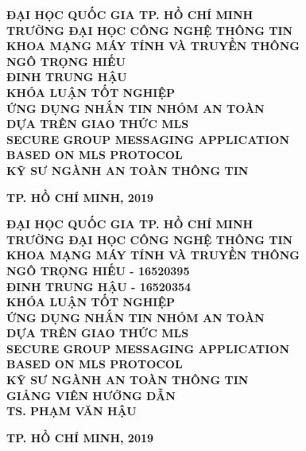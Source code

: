 \documentclass[../main-report.tex]{subfiles}
\begin{document}
\begin{titlepage}
\thispagestyle{empty}
\thisfancypage{
\setlength{\fboxsep}{3pt}
\fbox}{} 
\begin{center}
{\bf\large ĐẠI HỌC QUỐC GIA TP. HỒ CHÍ MINH}\\
{\bf\subtitlesize TRƯỜNG ĐẠI HỌC CÔNG NGHỆ THÔNG TIN}\\
{\bf\subtitlesize KHOA MẠNG MÁY TÍNH VÀ TRUYỀN THÔNG}\\[2.5cm]

{\bf\large NGÔ TRỌNG HIẾU}\\
{\bf\large ĐINH TRUNG HẬU}\\[2.5cm]

{\bf\large KHÓA LUẬN TỐT NGHIỆP}\\[0.5cm]
{\bf\Large ỨNG DỤNG NHẮN TIN NHÓM AN TOÀN}\\
{\bf\Large DỰA TRÊN GIAO THỨC MLS}\\[0.7cm]

{\bf\Large SECURE GROUP MESSAGING APPLICATION}\\
{\bf\Large BASED ON MLS PROTOCOL}\\[3cm]
{\bf\large KỸ SƯ NGÀNH AN TOÀN THÔNG TIN}\\[2cm]

\end{center}

\vspace{4cm}
\begin{center}
{\bf TP. HỒ CHÍ MINH, 2019}
\end{center}
\newpage

\thispagestyle{empty}
\thisfancypage{
\setlength{\fboxsep}{3pt}
\fbox}{} 
\begin{center}
{\bf\large ĐẠI HỌC QUỐC GIA TP. HỒ CHÍ MINH}\\
{\bf\subtitlesize TRƯỜNG ĐẠI HỌC CÔNG NGHỆ THÔNG TIN}\\
{\bf\subtitlesize KHOA MẠNG MÁY TÍNH VÀ TRUYỀN THÔNG}\\[3cm]

{\bf\large NGÔ TRỌNG HIẾU - 16520395}\\
{\bf\large ĐINH TRUNG HẬU - 16520354}\\[3cm]

{\bf\large KHÓA LUẬN TỐT NGHIỆP}\\[0.5cm]
{\bf\Large ỨNG DỤNG NHẮN TIN NHÓM AN TOÀN}\\
{\bf\Large DỰA TRÊN GIAO THỨC MLS}\\[0.5cm]

{\bf\Large SECURE GROUP MESSAGING APPLICATION}\\
{\bf\Large BASED ON MLS PROTOCOL}\\[2cm]

{\bf\large KỸ SƯ NGÀNH AN TOÀN THÔNG TIN}\\[2cm]
{\bf GIẢNG VIÊN HƯỚNG DẪN}\\
{\bf TS. PHẠM VĂN HẬU}
\end{center}

\vspace{3cm}
\begin{center}
{\bf TP. HỒ CHÍ MINH, 2019}
\end{center}
\end{titlepage}
\end{document}
